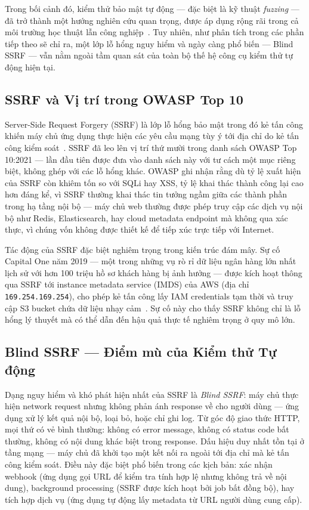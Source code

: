 Trong bối cảnh đó, kiểm thử bảo mật tự động --- đặc biệt là kỹ thuật \textit{fuzzing}
--- đã trở thành một hướng nghiên cứu quan trọng, được áp dụng rộng rãi trong cả môi
trường học thuật lẫn công nghiệp~\cite{manes2021art, zhu2022fuzzing}. Tuy nhiên, như
phân tích trong các phần tiếp theo sẽ chỉ ra, một lớp lỗ hổng nguy hiểm và ngày càng
phổ biến --- Blind SSRF --- vẫn nằm ngoài tầm quan sát của toàn bộ thế hệ công cụ
kiểm thử tự động hiện tại.

\subsection{SSRF và Vị trí trong OWASP Top 10}

Server-Side Request Forgery (SSRF) là lớp lỗ hổng bảo mật trong đó kẻ tấn công
khiến máy chủ ứng dụng thực hiện các yêu cầu mạng tùy ý tới địa chỉ do kẻ tấn công
kiểm soát~\cite{owasp2021top10}. SSRF đã leo lên vị trí thứ mười trong danh sách
OWASP Top 10:2021 --- lần đầu tiên được đưa vào danh sách này với tư cách một mục
riêng biệt, không ghép với các lỗ hổng khác. OWASP ghi nhận rằng dù tỷ lệ xuất hiện
của SSRF còn khiêm tốn so với SQLi hay XSS, tỷ lệ khai thác thành công lại cao hơn
đáng kể, vì SSRF thường khai thác tin tưởng ngầm giữa các thành phần trong hạ tầng
nội bộ --- máy chủ web thường được phép truy cập các dịch vụ nội bộ như Redis,
Elasticsearch, hay cloud metadata endpoint mà không qua xác thực, vì chúng vốn không
được thiết kế để tiếp xúc trực tiếp với Internet.

Tác động của SSRF đặc biệt nghiêm trọng trong kiến trúc đám mây. Sự cố Capital One
năm 2019 --- một trong những vụ rò rỉ dữ liệu ngân hàng lớn nhất lịch sử với hơn
100 triệu hồ sơ khách hàng bị ảnh hưởng --- được kích hoạt thông qua SSRF tới
instance metadata service (IMDS) của AWS (địa chỉ \texttt{169.254.169.254}), cho
phép kẻ tấn công lấy IAM credentials tạm thời và truy cập S3 bucket chứa dữ liệu
nhạy cảm~\cite{owasp2023ssrf}. Sự cố này cho thấy SSRF không chỉ là lỗ hổng lý
thuyết mà có thể dẫn đến hậu quả thực tế nghiêm trọng ở quy mô lớn.

\subsection{Blind SSRF --- Điểm mù của Kiểm thử Tự động}

Dạng nguy hiểm và khó phát hiện nhất của SSRF là \textit{Blind SSRF}: máy chủ thực
hiện network request nhưng không phản ánh response về cho người dùng --- ứng dụng
xử lý kết quả nội bộ, loại bỏ, hoặc chỉ ghi log. Từ góc độ giao thức HTTP, mọi thứ
có vẻ bình thường: không có error message, không có status code bất thường, không có
nội dung khác biệt trong response. Dấu hiệu duy nhất tồn tại ở tầng mạng --- máy
chủ đã khởi tạo một kết nối ra ngoài tới địa chỉ mà kẻ tấn công kiểm soát. Điều
này đặc biệt phổ biến trong các kịch bản: xác nhận webhook (ứng dụng gọi URL để
kiểm tra tính hợp lệ nhưng không trả về nội dung), background processing (SSRF được
kích hoạt bởi job bất đồng bộ), hay tích hợp dịch vụ (ứng dụng tự động lấy metadata
từ URL người dùng cung cấp).

